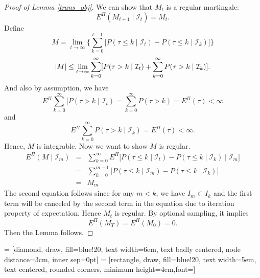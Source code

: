 \documentclass[preprint,authoryear,12pt,english]{elsarticle}
\theoremstyle{plain}
\begin{document}
\begin{proof}[Proof of Lemma \ref{trans_obj}]
    We can show that $M_{t}$ is a regular martingale:
    \begin{equation}
        E^{\Pi}(M_{t+1} \mid \mathcal{I}_{t}) = M_{t}.
    \end{equation}
    Define
    \begin{equation*}
        M = \lim_{t\rightarrow \infty} \{\sum_{k=0}^{t-1} \lbrack P(\tau \leq k \mid \mathcal{I}_{t})-P(\tau \leq k \mid \mathcal{I}_{k}) \rbrack \}
    \end{equation*}
    \begin{equation*}
        \abs{M} \leq \lim_{t\rightarrow \infty}  \sum_{k=0}^{\infty}\lbrack P(\tau > k \mid \mathcal{I}_{t}) +\sum_{k=0}^{\infty} P(\tau > k \mid \mathcal{I}_{k})\rbrack.
    \end{equation*}
    And also by assumption, we have
    \begin{equation*}
        E^{\Pi}\sum_{k=0}^{\infty}\lbrack P(\tau > k \mid \mathcal{I}_{t}) = \sum_{k=0}^{\infty}P(\tau>k) = E^{\Pi}(\tau)<\infty
    \end{equation*}
    and
    \begin{equation*}
        E^{\Pi}\sum_{k=0}^{\infty}P(\tau>k \mid \mathcal{I}_{k}) = E^{\Pi}(\tau)<\infty.
    \end{equation*}
    Hence, $M$ is integrable.
    Now we want to show $M$ is regular.
    \begin{eqnarray*}
        E^{\Pi}(M\mid \mathcal{I}_{m}) &=& \sum_{k=0}^{\infty} E^{\Pi}\lbrack P(\tau \leq k \mid \mathcal{I}_{t})-P(\tau \leq k \mid \mathcal{I}_{k})\mid \mathcal{I}_{m} \rbrack\\
        &=& \sum_{k=0}^{m-1} \lbrack P(\tau \leq k \mid \mathcal{I}_{m})-P(\tau \leq k \mid \mathcal{I}_{k}) \rbrack\\
        &=& M_{m}
    \end{eqnarray*}
    The second equation follows since for any $m<k$, we have $I_{m} \subset I_{k}$ and the first term will be canceled by the second term in the equation due to iteration property of expectation. Hence $ {M_{t}} $ is regular. By optional sampling, it implies
    \begin{equation}
        E^{\Pi}(M_{T}) = E^{\Pi}(M_{0}) = 0.
    \end{equation}
    Then the Lemma follows.
\end{proof}
\newpage
{} = [diamond, draw, fill=blue!20,
text width=6em, text badly centered, node distance=3cm, inner sep=0pt]
 = [rectangle, draw, fill=blue!20,
text width=5em, text centered, rounded corners, minimum height=4em,font=\footnotesize]
\end{document}
